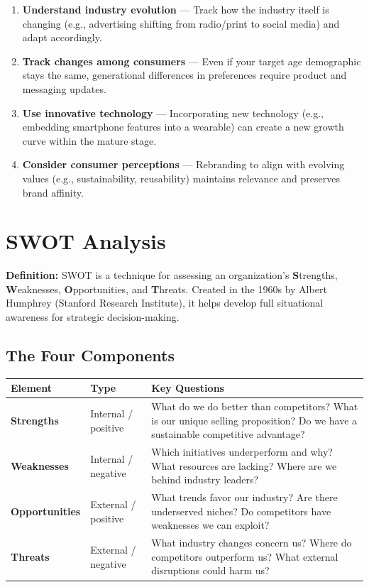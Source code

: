 \documentclass[11pt, letterpaper]{article}
\begin{document}
\begin{enumerate}[leftmargin=*, label=\textbf{\arabic*.}]
  \item \textbf{Understand industry evolution} --- Track how the industry itself is changing (e.g., advertising shifting from radio/print to social media) and adapt accordingly.
  \item \textbf{Track changes among consumers} --- Even if your target age demographic stays the same, generational differences in preferences require product and messaging updates.
  \item \textbf{Use innovative technology} --- Incorporating new technology (e.g., embedding smartphone features into a wearable) can create a new growth curve within the mature stage.
  \item \textbf{Consider consumer perceptions} --- Rebranding to align with evolving values (e.g., sustainability, reusability) maintains relevance and preserves brand affinity.
\end{enumerate}

\newpage

\section{SWOT Analysis}

\begin{defbox}
\textbf{Definition:} SWOT is a technique for assessing an organization's \textbf{S}trengths, \textbf{W}eaknesses, \textbf{O}pportunities, and \textbf{T}hreats. Created in the 1960s by Albert Humphrey (Stanford Research Institute), it helps develop full situational awareness for strategic decision-making.
\end{defbox}

\subsection{The Four Components}

\begin{center}
\begin{tabular}{>{\bfseries}p{2.5cm} p{2.5cm} p{8cm}}
\toprule
Element & Type & Key Questions \\
\midrule
Strengths & Internal / positive & What do we do better than competitors? What is our unique selling proposition? Do we have a sustainable competitive advantage? \\
\addlinespace
Weaknesses & Internal / negative & Which initiatives underperform and why? What resources are lacking? Where are we behind industry leaders? \\
\addlinespace
Opportunities & External / positive & What trends favor our industry? Are there underserved niches? Do competitors have weaknesses we can exploit? \\
\addlinespace
Threats & External / negative & What industry changes concern us? Where do competitors outperform us? What external disruptions could harm us? \\
\bottomrule
\end{tabular}
\end{center}
\end{document}
